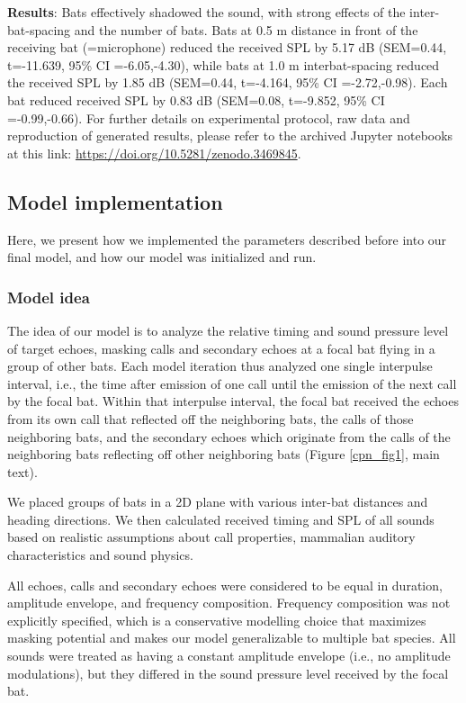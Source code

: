 \documentclass[
]{book}
\begin{document}
\textbf{Results}: Bats effectively shadowed the sound, with strong effects of the inter-bat-spacing and the number of bats. Bats at 0.5 m distance in front of the receiving bat (=microphone) reduced the received SPL by 5.17 dB (SEM=0.44, t=-11.639, 95\% CI =-6.05,-4.30), while bats at 1.0 m interbat-spacing reduced the received SPL by 1.85 dB (SEM=0.44, t=-4.164, 95\% CI =-2.72,-0.98). Each bat reduced received SPL by 0.83 dB (SEM=0.08, t=-9.852, 95\% CI =-0.99,-0.66).
For further details on experimental protocol, raw data and reproduction of
generated results, please refer to the archived Jupyter notebooks at this link:
\url{https://doi.org/10.5281/zenodo.3469845}.

\hypertarget{model-implementation-1}{%
\subsection{Model implementation}\label{model-implementation-1}}

Here, we present how we implemented the parameters described before into our
final model, and how our model was initialized and run.

\hypertarget{model-idea}{%
\subsubsection{Model idea}\label{model-idea}}

The idea of our model is to analyze the relative timing and sound pressure level
of target echoes, masking calls and secondary echoes at a focal bat flying in a
group of other bats. Each model iteration thus analyzed one single interpulse
interval, i.e., the time after emission of one call until the emission of the next call by the focal bat. Within that interpulse interval, the focal bat received the echoes from its own call that reflected off the neighboring bats, the calls of those neighboring bats, and the secondary echoes which originate from the calls of the neighboring bats reflecting off other neighboring bats (Figure \ref{cpn_fig1}, main text).

We placed groups of bats in a 2D plane with various inter-bat distances and
heading directions. We then calculated received timing and SPL of all sounds
based on realistic assumptions about call properties, mammalian auditory
characteristics and sound physics.

All echoes, calls and secondary echoes were considered to be equal in duration,
amplitude envelope, and frequency composition. Frequency composition was not
explicitly specified, which is a conservative modelling choice that maximizes
masking potential \citep{w2007a} and makes our model generalizable to multiple bat species. All sounds were treated as having a constant amplitude envelope (i.e., no amplitude modulations), but they differed in the sound pressure level received by the focal bat.
\end{document}
